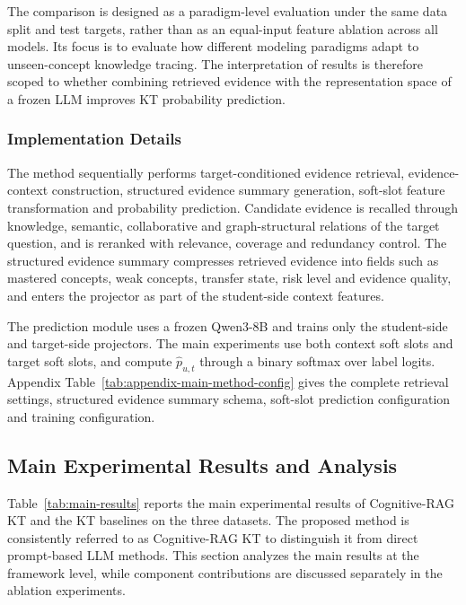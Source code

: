 \documentclass[a4paper,12pt]{article}
\numberwithin{table}{section}
\begin{document}
The comparison is designed as a paradigm-level evaluation under the same data split and test targets, rather than as an equal-input feature ablation across all models. Its focus is to evaluate how different modeling paradigms adapt to unseen-concept knowledge tracing. The interpretation of results is therefore scoped to whether combining retrieved evidence with the representation space of a frozen LLM improves KT probability prediction.

\subsubsection{Implementation Details}

The method sequentially performs target-conditioned evidence retrieval, evidence-context construction, structured evidence summary generation, soft-slot feature transformation and probability prediction. Candidate evidence is recalled through knowledge, semantic, collaborative and graph-structural relations of the target question, and is reranked with relevance, coverage and redundancy control. The structured evidence summary compresses retrieved evidence into fields such as mastered concepts, weak concepts, transfer state, risk level and evidence quality, and enters the projector as part of the student-side context features.

The prediction module uses a frozen Qwen3-8B and trains only the student-side and target-side projectors. The main experiments use both context soft slots and target soft slots, and compute \(\hat{p}_{u,t}\) through a binary softmax over label logits\citep{yang2025qwen3,qwen2025qwen38b,qwen2025qwen3embedding,qwen2025qwen3reranker}. Appendix Table~\ref{tab:appendix-main-method-config} gives the complete retrieval settings, structured evidence summary schema, soft-slot prediction configuration and training configuration.

\subsection{Main Experimental Results and Analysis}

Table~\ref{tab:main-results} reports the main experimental results of Cognitive-RAG KT and the KT baselines on the three datasets. The proposed method is consistently referred to as Cognitive-RAG KT to distinguish it from direct prompt-based LLM methods. This section analyzes the main results at the framework level, while component contributions are discussed separately in the ablation experiments.
\end{document}
